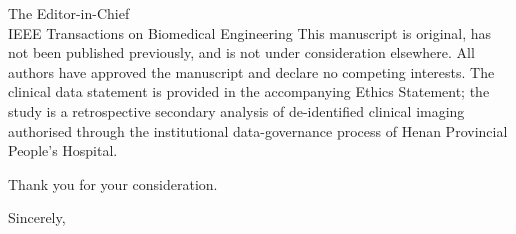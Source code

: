 \documentclass[10pt]{letter}
\begin{document}
\begin{letter}{The Editor-in-Chief\\IEEE Transactions on Biomedical Engineering}
This manuscript is original, has not been published previously, and is not
under consideration elsewhere. All authors have approved the manuscript and
declare no competing interests. The clinical data statement is provided in the
accompanying Ethics Statement; the study is a retrospective secondary analysis
of de-identified clinical imaging authorised through the institutional
data-governance process of Henan Provincial People's Hospital.

Thank you for your consideration.

\closing{Sincerely,}
\end{letter}
\end{document}
